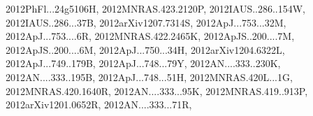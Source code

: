 \documentclass[12pt]{article}
\begin{document}
\begin{description}
{2012PhFl...24g5106H,%
2012MNRAS.423.2120P,%
2012IAUS..286..154W,%
2012IAUS..286...37B,%
2012arXiv1207.7314S,%
2012ApJ...753...32M,%
2012ApJ...753....6R,%
2012MNRAS.422.2465K,%
2012ApJS..200....7M,%
2012ApJS..200....6M,%
2012ApJ...750...34H,%
2012arXiv1204.6322L,%
2012ApJ...749..179B,%
2012ApJ...748...79Y,%
2012AN....333..230K,%
2012AN....333..195B,%
2012ApJ...748...51H,%
2012MNRAS.420L...1G,%
2012MNRAS.420.1640R,%
2012AN....333...95K,%
2012MNRAS.419..913P,%
2012arXiv1201.0652R,%
2012AN....333...71R,%
}
\end{description}
\end{document}
